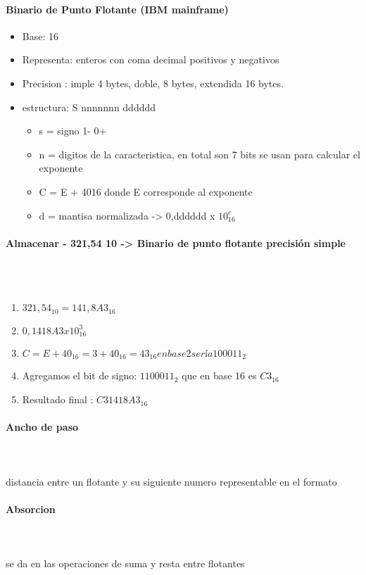 \paragraph{Binario de Punto Flotante (IBM mainframe)}
\begin{itemize}
\item Base: 16
\item Representa: enteros con coma decimal positivos y negativos
\item Precision : imple 4 bytes, doble, 8 bytes, extendida 16 bytes.
\item estructura: S nnnnnnn dddddd
\begin{itemize}
    \item s = signo 1- 0+
    \item n = digitos de la caracteristica, en total son 7 bits se usan para calcular el exponente 
    \item C = E + 4016 donde E corresponde al exponente
    \item d =  mantisa normalizada -> 0,dddddd x $10^e_{16}$
  \end{itemize}
\end{itemize}

\paragraph{Almacenar - 321,54 10 -> Binario de punto flotante precisión simple}\mbox{}\\\\
\begin{enumerate}    
  \item $321,54_{10} = 141,8A3_{16}$
  \item $0,1418A3 x 10^3 _{16}$
  \item $C = E + 40_{16} = 3 + 40_{16} = 43_{16} en base 2 sería 100011_{2}$
  \item Agregamos el bit de signo: $1100011_{2}$ que en base 16 es $C3_{16}$
  \item Resultado final : $C31418A3_{16}$
\end{enumerate}

\paragraph{Ancho de paso }\mbox{}\\\\
distancia entre un flotante y su siguiente numero representable en el formato

\paragraph{Absorcion}\mbox{}\\\\
se da en las operaciones de suma y resta entre flotantes

